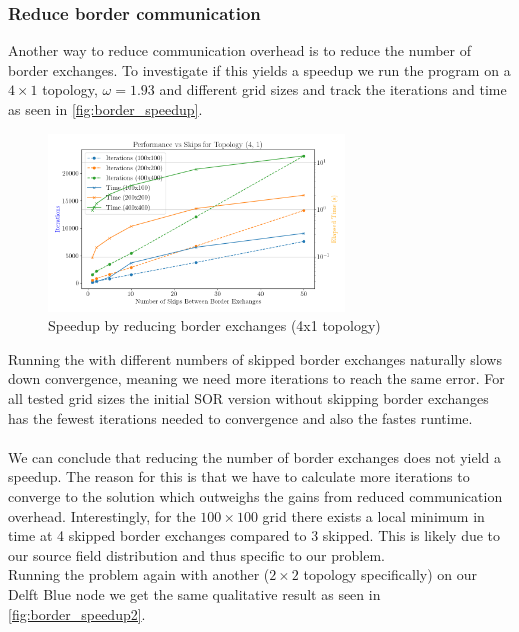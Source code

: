\subsubsection{Reduce border communication}
Another way to reduce communication overhead is to reduce the number of border exchanges. To investigate if this yields a speedup  we run the program on a $4 \times 1$ topology, $\omega = 1.93$ and different grid sizes and track the iterations and time as seen in \autoref{fig:border_speedup}.

\begin{figure}[H]
    \centering
    \includegraphics[width=0.7\textwidth]{../fig/lab1/skips_topology_4x1.png}
    \caption{Speedup by reducing border exchanges (4x1 topology)}
    \label{fig:border_speedup}
\end{figure}

Running the with different numbers of skipped border exchanges naturally slows down convergence, meaning we need more iterations to reach the same error. For all tested grid sizes the initial SOR version without skipping border exchanges has the fewest iterations needed to convergence and also the fastes runtime. \\
\\
We can conclude that reducing the number of border exchanges does not yield a speedup. The reason for this is that we have to calculate more iterations to converge to the solution which outweighs the gains from reduced communication overhead. Interestingly, for the $100 \times 100$ grid there exists a local minimum in time at 4 skipped border exchanges compared to 3 skipped. This is likely due to our source field distribution and thus specific to our problem.\\

Running the problem again with another ($2\times 2$ topology specifically) on our Delft Blue node we get the same qualitative result as seen in \autoref{fig:border_speedup2}. 

